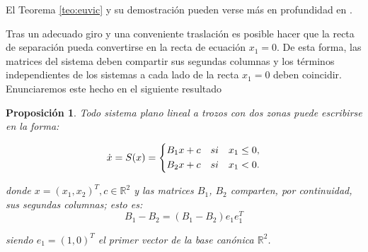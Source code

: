 \documentclass[12pt,a4paper]{report} %
\newtheorem{proposicion}{Proposición}[chapter]
\newcommand{\eref}[1]{\hyperref[#1]{\textcolor{blue}{(\ref*{#1})}}}
\begin{document}
	\noindent El Teorema \ref{teo:euvic} y su demostración pueden verse más en profundidad en \cite{docvic}.

	
	\vspace{0.5cm} Tras un adecuado giro y una conveniente traslación es posible hacer que la recta de separación pueda convertirse en la recta de ecuación $x_1=0$. De esta forma, las matrices del sistema deben compartir sus segundas columnas y los términos independientes de los sistemas a cada lado de la recta $x_1=0$ deben coincidir. Enunciaremos este hecho en el siguiente resultado
	
	\vspace{0.5cm}\begin{proposicion}
		Todo sistema plano lineal a trozos con dos zonas puede escribirse en la forma:
	
	\begin{equation}
		\dot{x}=S(x)=
		\label{eq:lien}
		\scalebox{1}{$\displaystyle
			\left\{
			\begin{aligned}
				B_1x+c\quad si \quad x_1 \leq 0, \\
				B_2x+c\quad si \quad x_1 < 0.
			\end{aligned}
			\right.
			$}
	\end{equation}\smallskip
	
	\noindent donde $x=(x_1,x_2)^T, c\in \mathbb{R}^2$ y las matrices $B_1$, $B_2$ comparten, por continuidad, sus segundas columnas; esto es:
	\begin{equation}
		B_1-B_2 = \left(B_1-B_2\right)e_1e_1^T
	\end{equation}
	
	\noindent siendo $e_1=(1,0)^T$ el primer vector de la base canónica $\mathbb{R}^2$.
    \end{proposicion}\smallskip
\end{document}
